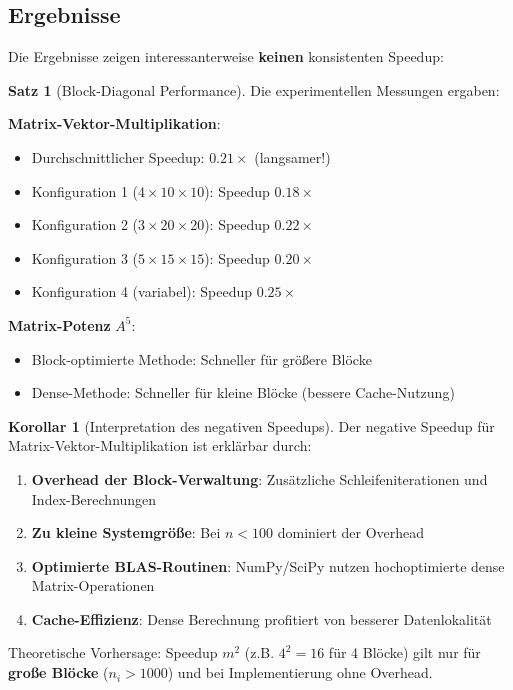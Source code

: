 \documentclass[a4paper,12pt]{report}
\theoremstyle{definition}
\newtheorem{satz}{Satz}
\newtheorem{korollar}{Korollar}
\begin{document}
	\subsection{Ergebnisse}
	
	Die Ergebnisse zeigen interessanterweise \textbf{keinen} konsistenten Speedup:
	
	\begin{satz}[Block-Diagonal Performance]
		Die experimentellen Messungen ergaben:
		
		\textbf{Matrix-Vektor-Multiplikation}:
		\begin{itemize}
			\item Durchschnittlicher Speedup: $0.21\times$ (langsamer!)
			\item Konfiguration 1 ($4 \times 10 \times 10$): Speedup $0.18\times$
			\item Konfiguration 2 ($3 \times 20 \times 20$): Speedup $0.22\times$
			\item Konfiguration 3 ($5 \times 15 \times 15$): Speedup $0.20\times$
			\item Konfiguration 4 (variabel): Speedup $0.25\times$
		\end{itemize}
		
		\textbf{Matrix-Potenz} $A^5$:
		\begin{itemize}
			\item Block-optimierte Methode: Schneller für größere Blöcke
			\item Dense-Methode: Schneller für kleine Blöcke (bessere Cache-Nutzung)
		\end{itemize}
	\end{satz}
	
	\begin{korollar}[Interpretation des negativen Speedups]
		Der negative Speedup für Matrix-Vektor-Multiplikation ist erklärbar durch:
		\begin{enumerate}
			\item \textbf{Overhead der Block-Verwaltung}: Zusätzliche Schleifeniterationen und Index-Berechnungen
			\item \textbf{Zu kleine Systemgröße}: Bei $n < 100$ dominiert der Overhead
			\item \textbf{Optimierte BLAS-Routinen}: NumPy/SciPy nutzen hochoptimierte dense Matrix-Operationen
			\item \textbf{Cache-Effizienz}: Dense Berechnung profitiert von besserer Datenlokalität
		\end{enumerate}
		
		Theoretische Vorhersage: Speedup $m^2$ (z.B. $4^2 = 16$ für 4 Blöcke) gilt nur für \textbf{große Blöcke} ($n_i > 1000$) und bei Implementierung ohne Overhead.
	\end{korollar}
	
\end{document}
